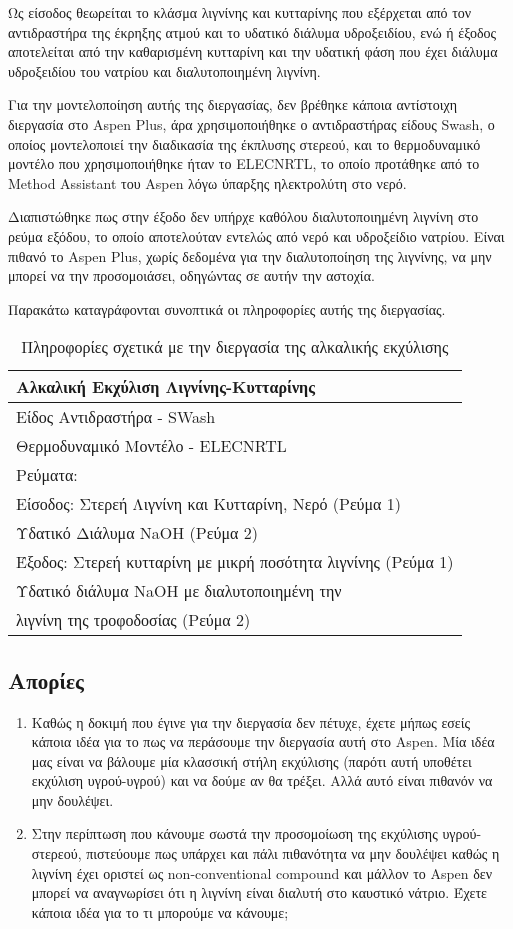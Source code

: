 \documentclass[11pt]{article}
\begin{document}
Ως είσοδος θεωρείται το κλάσμα λιγνίνης και κυτταρίνης που εξέρχεται από
τον αντιδραστήρα της έκρηξης ατμού και το υδατικό διάλυμα υδροξειδίου,
ενώ ή έξοδος αποτελείται από την καθαρισμένη κυτταρίνη και την υδατική φάση που έχει διάλυμα υδροξειδίου του νατρίου και διαλυτοποιημένη λιγνίνη.  

Για την μοντελοποίηση αυτής της διεργασίας, δεν βρέθηκε κάποια
αντίστοιχη διεργασία στο Aspen Plus, άρα χρησιμοποιήθηκε ο αντιδραστήρας
είδους Swash, ο οποίος μοντελοποιεί την διαδικασία της έκπλυσης στερεού,
και το θερμοδυναμικό μοντέλο που χρησιμοποιήθηκε ήταν το ELECNRTL, το
οποίο προτάθηκε από το Method Assistant του Aspen λόγω ύπαρξης
ηλεκτρολύτη στο νερό.

Διαπιστώθηκε πως στην έξοδο δεν υπήρχε καθόλου διαλυτοποιημένη λιγνίνη
στο ρεύμα εξόδου, το οποίο αποτελούταν εντελώς από νερό και υδροξείδιο
νατρίου. Είναι πιθανό το Aspen Plus, χωρίς δεδομένα για την
διαλυτοποίηση της λιγνίνης, να μην μπορεί να την προσομοιάσει, οδηγώντας
σε αυτήν την αστοχία.

Παρακάτω καταγράφονται συνοπτικά οι πληροφορίες αυτής της διεργασίας.

\begin{table}[htbp]
\caption{Πληροφορίες σχετικά με την διεργασία της αλκαλικής εκχύλισης}
\centering
\begin{tabular}{l}
\hline
Αλκαλική Εκχύλιση Λιγνίνης-Κυτταρίνης\\
\hline
Είδος Αντιδραστήρα - SWash\\
Θερμοδυναμικό Μοντέλο - ELECNRTL\\
Ρεύματα:\\
\hline
Είσοδος: Στερεή Λιγνίνη και Κυτταρίνη, Νερό (Ρεύμα 1)\\
Υδατικό Διάλυμα NaOH (Ρεύμα 2)\\
\hline
Έξοδος: Στερεή κυτταρίνη με μικρή ποσότητα λιγνίνης (Ρεύμα 1)\\
Υδατικό διάλυμα NaOH με διαλυτοποιημένη την\\
λιγνίνη της τροφοδοσίας (Ρεύμα 2)\\
\hline
\end{tabular}
\end{table}

\subsection{Απορίες}
\label{sec:org0d9391e}
\begin{enumerate}
\item Καθώς η δοκιμή που έγινε για την διεργασία δεν πέτυχε, έχετε μήπως εσείς κάποια ιδέα για το πως να περάσουμε την διεργασία αυτή στο Aspen. Μία ιδέα μας είναι να βάλουμε μία κλασσική στήλη εκχύλισης (παρότι αυτή υποθέτει εκχύλιση υγρού-υγρού) και να δούμε αν θα τρέξει. Αλλά αυτό είναι πιθανόν να μην δουλέψει.
\item Στην περίπτωση που κάνουμε σωστά την προσομοίωση της εκχύλισης υγρού-στερεού, πιστεύουμε πως υπάρχει και πάλι πιθανότητα να μην δουλέψει καθώς η λιγνίνη έχει οριστεί ως non-conventional compound και μάλλον το Aspen δεν μπορεί να αναγνωρίσει ότι η λιγνίνη είναι διαλυτή στο καυστικό νάτριο. Έχετε κάποια ιδέα για το τι μπορούμε να κάνουμε;
\end{enumerate}
\end{document}
